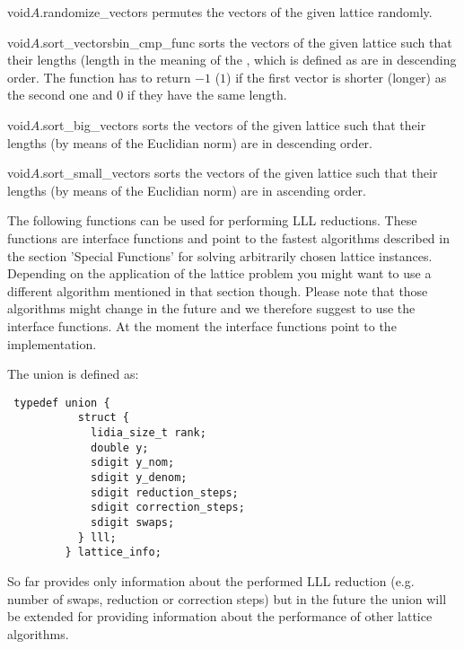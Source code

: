 \begin{fcode}{void}{$A$.randomize_vectors}{}
  permutes the vectors of the given lattice randomly.
\end{fcode}

\begin{fcode}{void}{$A$.sort_vectors}{bin_cmp_func}
  sorts the vectors of the given lattice such that their lengths (length in the meaning of the
  , which is defined as  are in descending order.  The function  has to return
  $-1$ ($1$) if the first vector is shorter (longer) as the second one and $0$ if they have the
  same length.
\end{fcode}

\begin{fcode}{void}{$A$.sort_big_vectors}{}
  sorts the vectors of the given lattice such that their lengths (by means of the Euclidian
  norm) are in descending order.
\end{fcode}

\begin{fcode}{void}{$A$.sort_small_vectors}{}
  sorts the vectors of the given lattice such that their lengths (by means of the Euclidian
  norm) are in ascending order.
\end{fcode}




The following functions can be used for performing LLL reductions.  These functions are
interface functions and point to the fastest algorithms described in the section 'Special
Functions' for solving arbitrarily chosen lattice instances.  Depending on the application of
the lattice problem you might want to use a different algorithm mentioned in that section
though.  Please note that those algorithms might change in the future and we therefore suggest
to use the interface functions.  At the moment the interface functions point to the
 implementation.

The union  is defined as:
\begin{verbatim}
 typedef union {
           struct {
             lidia_size_t rank;
             double y;
             sdigit y_nom;
             sdigit y_denom;
             sdigit reduction_steps;
             sdigit correction_steps;
             sdigit swaps;
           } lll;
         } lattice_info;
\end{verbatim}
So far  provides only information about the performed LLL reduction (e.g.
number of swaps, reduction or correction steps) but in the future the union will be extended for
providing information about the performance of other lattice algorithms.

